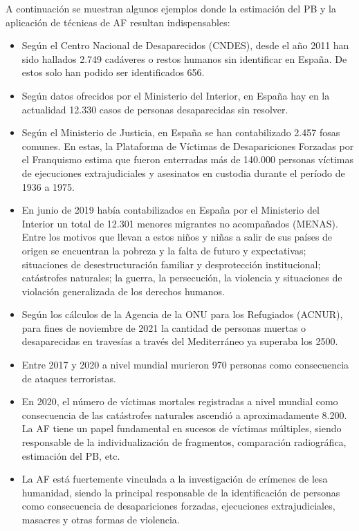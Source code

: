 A continuación se muestran algunos ejemplos donde la estimación del PB y la aplicación de técnicas de AF resultan indispensables:

\begin{itemize}
    \item Según el Centro Nacional de Desaparecidos (CNDES), desde el año 2011 han sido hallados 2.749 cadáveres o restos humanos sin identificar en España. De estos solo han podido ser identificados 656.
    
    \item Según datos ofrecidos por el Ministerio del Interior, en España hay en la actualidad 12.330 casos de personas desaparecidas sin resolver.
    
    \item Según el Ministerio de Justicia, en España se han contabilizado 2.457 fosas comunes. En estas,  la Plataforma de Víctimas de Desapariciones Forzadas por el Franquismo estima que fueron enterradas más de 140.000 personas víctimas de ejecuciones extrajudiciales y asesinatos en custodia durante el período de 1936 a 1975.
    
    \item En junio de 2019 había contabilizados en España por el Ministerio del Interior un total de 12.301 menores migrantes no acompañados (MENAS). Entre los motivos que llevan a estos niños y niñas a salir de sus países de origen se encuentran la pobreza y la falta de futuro y expectativas; situaciones de desestructuración familiar y desprotección institucional; catástrofes naturales; la guerra, la persecución, la violencia y situaciones de violación generalizada de los derechos humanos.
    
    \item Según los cálculos de la Agencia de la ONU para los Refugiados (ACNUR), para fines de noviembre de 2021 la cantidad de personas muertas o desaparecidas en travesías a través del Mediterráneo ya superaba los 2500.
    
    \item Entre 2017 y 2020 a nivel mundial murieron 970 personas como consecuencia de ataques terroristas.
    
    \item En 2020, el número de víctimas mortales registradas a nivel mundial como consecuencia de las catástrofes naturales ascendió a aproximadamente 8.200. La AF tiene un papel fundamental en sucesos de víctimas múltiples, siendo responsable de la individualización de fragmentos, comparación radiográfica, estimación del PB, etc. 
    
    \item La AF está fuertemente vinculada a la investigación de crímenes de lesa humanidad, siendo la principal responsable de la identificación de personas como consecuencia de desapariciones forzadas, ejecuciones extrajudiciales, masacres y otras formas de violencia. 
    
\end{itemize}

